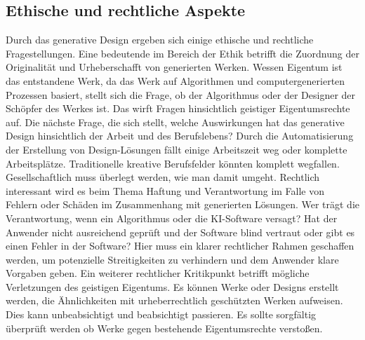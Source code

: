 \subsection*{Ethische und rechtliche Aspekte}
Durch das generative Design ergeben sich einige ethische und rechtliche Fragestellungen. Eine bedeutende im Bereich der Ethik betrifft die Zuordnung der Originalität und Urheberschafft von generierten Werken. Wessen Eigentum ist das entstandene Werk, da das Werk auf Algorithmen und computergenerierten Prozessen basiert, stellt sich die Frage, ob der Algorithmus oder der Designer der Schöpfer des Werkes ist. Das wirft Fragen hinsichtlich geistiger Eigentumsrechte auf. 
Die nächste Frage, die sich stellt, welche Auswirkungen hat das generative Design hinsichtlich der Arbeit und des Berufslebens? Durch die Automatisierung der Erstellung von Design-Lösungen fällt einige Arbeitszeit weg oder komplette Arbeitsplätze. Traditionelle kreative Berufsfelder könnten komplett wegfallen. Gesellschaftlich muss überlegt werden, wie man damit umgeht. 
Rechtlich interessant wird es beim Thema Haftung und Verantwortung im Falle von Fehlern oder Schäden im Zusammenhang mit generierten Lösungen. Wer trägt die Verantwortung, wenn ein Algorithmus oder die KI-Software versagt? Hat der Anwender nicht ausreichend geprüft und der Software blind vertraut oder gibt es einen Fehler in der Software? Hier muss ein klarer rechtlicher Rahmen geschaffen werden, um potenzielle Streitigkeiten zu verhindern und dem Anwender klare Vorgaben geben. 
Ein weiterer rechtlicher Kritikpunkt betrifft mögliche Verletzungen des geistigen Eigentums. Es können Werke oder Designs erstellt werden, die Ähnlichkeiten mit urheberrechtlich geschützten Werken aufweisen. Dies kann unbeabsichtigt und beabsichtigt passieren. Es sollte sorgfältig überprüft werden ob Werke gegen bestehende Eigentumsrechte verstoßen.
